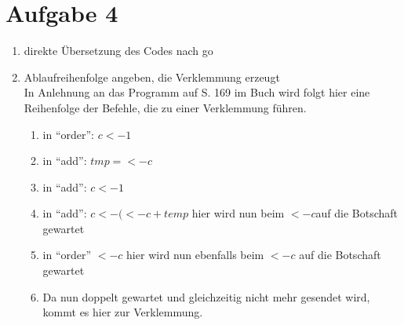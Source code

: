 \documentclass[11pt,a4paper,DIV=10,]{scrartcl}
\begin{document}
\section*{Aufgabe 4}
\begin{enumerate}
 \item direkte Übersetzung des Codes nach go 
 
 
 \item Ablaufreihenfolge angeben, die Verklemmung erzeugt \\
 In Anlehnung an das Programm auf S. 169 im Buch wird folgt hier eine Reihenfolge der Befehle, die zu einer Verklemmung führen. 
\begin{enumerate}
  \item in ``order'': $c<-1$
  \item in ``add'': $tmp=<-c$
  \item in ``add'': $c<-1$
  \item in ``add'': $c<- (<-c+temp$ hier wird nun beim $ <-c $auf die Botschaft gewartet
  \item in ``order'' $<-c$ hier wird nun ebenfalls beim $<-c$ auf die Botschaft gewartet
  \item Da nun doppelt gewartet und gleichzeitig nicht mehr gesendet wird, kommt es hier zur Verklemmung. 
\end{enumerate}

 
\end{enumerate}


\end{document}
